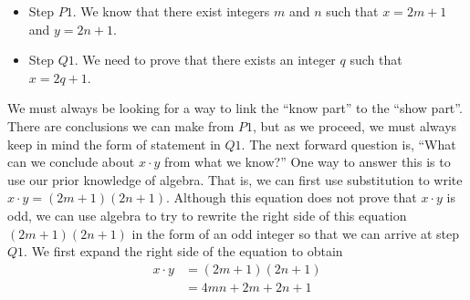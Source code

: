 \begin{itemize}
  \item Step $P1$.  We know that there exist integers $m$ and $n$ such that $x = 2m + 1$ and $y = 2n + 1$.
  \item Step $Q1$.  We need to prove that there exists an integer $q$ such that \\$x = 2q + 1$.
\end{itemize}
%
We must always be looking for a way to link the ``know part'' to the ``show part''.  There are conclusions we can make from $P1$, but as we proceed, we must always keep in mind the form of statement in $Q1$.  The next forward question is, ``What can we conclude about  $x \cdot y$  from what we know?''  One way to answer this is to use our prior knowledge of algebra.  That is, we can first use substitution to write  $x \cdot y = \left( {2m + 1} \right)\left( {2n + 1} \right)$.  Although this equation does not prove that $x \cdot y$ is odd, we can use algebra to try to rewrite the right side of this equation 
$\left( {2m + 1} \right)\left( {2n + 1} \right)$ in the form of an odd integer so that we can arrive at 
step $Q1$.  We first expand the right side of the equation to obtain
\begin{align*}
x \cdot y &= (2m + 1)(2n + 1) \\
          &= 4mn + 2m + 2n + 1
\end{align*}
